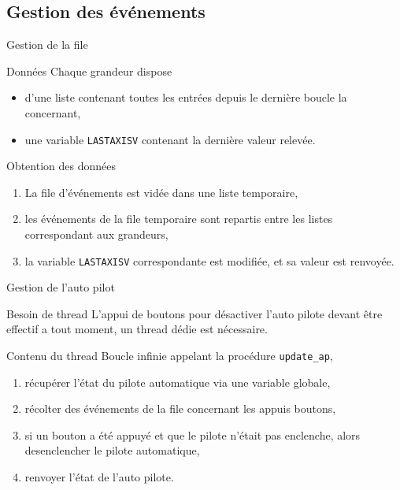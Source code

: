 \documentclass[footheight=2em]{beamer}
\begin{document}
\subsection{Gestion des événements}
\begin{frame}[t]{Gestion de la file}
  \begin{block}{Données}
    Chaque grandeur dispose
    \begin{itemize}
      \item d'une liste contenant toutes les entrées depuis le dernière boucle
        la concernant,
      \item une variable \texttt{LASTAXISV} contenant la dernière
        valeur relevée.
    \end{itemize}
  \end{block}
  \begin{block}{Obtention des données}
    \begin{enumerate}
      \item La file d'événements est vidée dans une liste temporaire,
      \item les événements de la file temporaire sont repartis entre les listes
        correspondant aux grandeurs,
      \item la variable \texttt{LASTAXISV} correspondante est modifiée, et sa
        valeur est renvoyée.
    \end{enumerate}
  \end{block}
\end{frame}

\begin{frame}[t]{Gestion de l'auto pilot}
  \begin{block}{Besoin de thread}
    L'appui de boutons pour désactiver l'auto pilote devant être effectif a tout
    moment, un thread dédie est nécessaire.
  \end{block}
  \begin{block}{Contenu du thread}
    Boucle infinie appelant la procédure \texttt{update\_ap},
    \begin{enumerate}
      \item récupérer l'état du pilote automatique via une variable
        globale,
      \item récolter des événements de la file concernant les appuis boutons,
      \item si un bouton a été appuyé et que le pilote n'était pas enclenche,
        alors desenclencher le pilote automatique,
      \item renvoyer l'état de l'auto pilote.
    \end{enumerate}
  \end{block}
\end{frame}
\end{document}
